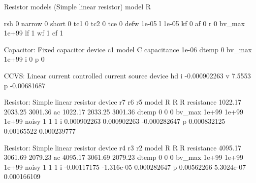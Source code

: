  Resistor models (Simple linear resistor)
      model                     R

        rsh                     0
     narrow                     0
      short                     0
        tc1                     0
        tc2                     0
        tce                     0
       defw                 1e-05
          l                 1e-05
         kf                     0
         af                     0
          r                     0
     bv_max                 1e+99
         lf                     1
         wf                     1
         ef                     1

 Capacitor: Fixed capacitor
     device                    c1
      model                     C
capacitance                 1e-06
      dtemp                     0
     bv_max                 1e+99
          i                     0
          p                     0

 CCVS: Linear current controlled current source
     device                    hd
          i          -0.000902263
          v                7.5553
          p           -0.00681687

 Resistor: Simple linear resistor
     device                    r7                    r6                    r5
      model                     R                     R                     R
 resistance               1022.17               2033.25               3001.36
         ac               1022.17               2033.25               3001.36
      dtemp                     0                     0                     0
     bv_max                 1e+99                 1e+99                 1e+99
      noisy                     1                     1                     1
          i           0.000902263           0.000902263          -0.000282647
          p           0.000832125            0.00165522           0.000239777

 Resistor: Simple linear resistor
     device                    r4                    r3                    r2
      model                     R                     R                     R
 resistance               4095.17               3061.69               2079.23
         ac               4095.17               3061.69               2079.23
      dtemp                     0                     0                     0
     bv_max                 1e+99                 1e+99                 1e+99
      noisy                     1                     1                     1
          i           -0.00117175            -1.316e-05           0.000282647
          p            0.00562266            5.3024e-07           0.000166109

